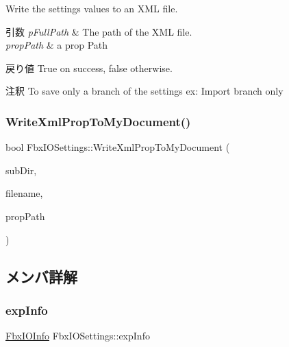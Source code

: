 Write the settings values to an X\+ML file. 
\begin{DoxyParams}{引数}
{\em p\+Full\+Path} & The path of the X\+ML file. \\
\hline
{\em prop\+Path} & a prop Path \\
\hline
\end{DoxyParams}
\begin{DoxyReturn}{戻り値}
{\ttfamily True} on success, {\ttfamily false} otherwise. 
\end{DoxyReturn}
\begin{DoxyRemark}{注釈}
To save only a branch of the settings ex\+: Import branch only 
\end{DoxyRemark}
\mbox{\label{class_fbx_i_o_settings_a7cdebdeff147dbdb99faaadc874e5d69}} 
\subsubsection{\texorpdfstring{Write\+Xml\+Prop\+To\+My\+Document()}{WriteXmlPropToMyDocument()}}
{\footnotesize\ttfamily bool Fbx\+I\+O\+Settings\+::\+Write\+Xml\+Prop\+To\+My\+Document (\begin{DoxyParamCaption}\item[{const \hyperlink{class_fbx_string}{Fbx\+String} \&}]{sub\+Dir,  }\item[{const \hyperlink{class_fbx_string}{Fbx\+String} \&}]{filename,  }\item[{const \hyperlink{class_fbx_string}{Fbx\+String} \&}]{prop\+Path }\end{DoxyParamCaption})}



\subsection{メンバ詳解}
\mbox{\label{class_fbx_i_o_settings_a138a9e01c4f15719b15710a0d9393623}} 
\subsubsection{\texorpdfstring{exp\+Info}{expInfo}}
{\footnotesize\ttfamily \hyperlink{class_fbx_i_o_info}{Fbx\+I\+O\+Info} Fbx\+I\+O\+Settings\+::exp\+Info}



